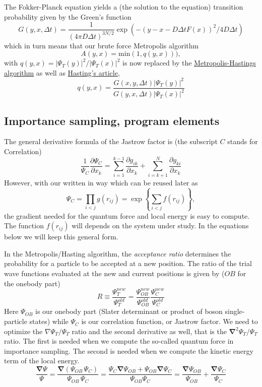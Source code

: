 The Fokker-Planck equation yields a (the solution to the equation) transition probability given by the Green's function
\[
  G(y,x,\Delta t) = \frac{1}{(4\pi D\Delta t)^{3N/2}} \exp{\left(-(y-x-D\Delta t F(x))^2/4D\Delta t\right)}
\]
which in turn means that our brute force Metropolis algorithm
\[ 
    A(y,x) = \mathrm{min}(1,q(y,x))),
\]
with $q(y,x) = |\Psi_T(y)|^2/|\Psi_T(x)|^2$ is now replaced by the \href{{http://scitation.aip.org/content/aip/journal/jcp/21/6/10.1063/1.1699114}}{Metropolis-Hastings algorithm} as well as \href{{http://biomet.oxfordjournals.org/content/57/1/97.abstract}}{Hasting's article}, 
\[
q(y,x) = \frac{G(x,y,\Delta t)|\Psi_T(y)|^2}{G(y,x,\Delta t)|\Psi_T(x)|^2}
\]

\subsection*{Importance sampling, program elements}

The general derivative formula of the Jastrow factor is (the subscript $C$ stands for Correlation)
\[
\frac{1}{\Psi_C}\frac{\partial \Psi_C}{\partial x_k} =
\sum_{i=1}^{k-1}\frac{\partial g_{ik}}{\partial x_k}
+
\sum_{i=k+1}^{N}\frac{\partial g_{ki}}{\partial x_k}
\]
However, 
with our written in way which can be reused later as
\[
\Psi_C=\prod_{i< j}g(r_{ij})= \exp{\left\{\sum_{i<j}f(r_{ij})\right\}},
\]
the gradient needed for the quantum force and local energy is easy to compute.  
The function $f(r_{ij})$ will depends on the system under study. In the equations below we will keep this general form.

In the Metropolis/Hasting algorithm, the \emph{acceptance ratio} determines the probability for a particle  to be accepted at a new position. The ratio of the trial wave functions evaluated at the new and current positions is given by ($OB$ for the onebody  part)
\[
R \equiv \frac{\Psi_{T}^{new}}{\Psi_{T}^{old}} = 
\frac{\Psi_{OB}^{new}}{\Psi_{OB}^{old}}\frac{\Psi_{C}^{new}}{\Psi_{C}^{old}}
\]
Here $\Psi_{OB}$ is our onebody part (Slater determinant or product of boson single-particle states)  while $\Psi_{C}$ is our correlation function, or Jastrow factor. 
We need to optimize the $\nabla \Psi_T / \Psi_T$ ratio and the second derivative as well, that is
the $\mathbf{\nabla}^2 \Psi_T/\Psi_T$ ratio. The first is needed when we compute the so-called quantum force in importance sampling.
The second is needed when we compute the kinetic energy term of the local energy.
\[
\frac{\mathbf{\mathbf{\nabla}}  \Psi}{\Psi}  = \frac{\mathbf{\nabla}  (\Psi_{OB} \, \Psi_{C})}{\Psi_{OB} \, \Psi_{C}}  =  \frac{ \Psi_C \mathbf{\nabla}  \Psi_{OB} + \Psi_{OB} \mathbf{\nabla}  \Psi_{C}}{\Psi_{OB} \Psi_{C}} = \frac{\mathbf{\nabla}  \Psi_{OB}}{\Psi_{OB}} + \frac{\mathbf{\nabla}   \Psi_C}{ \Psi_C}
\]

